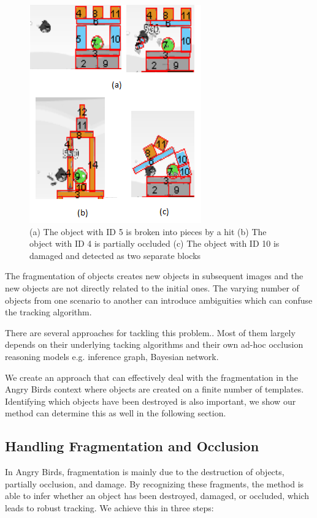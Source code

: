 \documentclass[letterpaper]{article}
\begin{document}
\begin{figure}[t!]
\centering\includegraphics[scale=0.7]{Fragmentation.png}\caption{(a) The object with ID 5 is broken into pieces by a hit (b) The object with ID 4 is partially occluded (c) The object with ID 10 is damaged and detected as two separate blocks}
\label{Fragments}
\end{figure}

The fragmentation of objects creates new objects in subsequent images and the new objects are not directly related to the initial ones. The varying number of objects from one scenario to another can introduce ambiguities which can confuse the tracking algorithm. 

There are several approaches for tackling this problem.\cite{Occlusion1,Occlusion2,Occlusion3}. Most of them largely depends on their underlying tacking algorithms and their own ad-hoc occlusion reasoning models e.g. inference graph, Bayesian network. 

We create an approach that can effectively deal with the fragmentation in the Angry Birds context where objects are created on a finite number of templates. 
Identifying which objects have been destroyed is also important, we show our method can determine this as well in the following section.   

\subsection{Handling Fragmentation and Occlusion}
 
In Angry Birds, fragmentation is mainly due to the destruction of objects, partially occlusion, and damage. By recognizing these fragments, the method is able to infer whether an object has been destroyed, damaged, or occluded, which leads to robust tracking. We achieve this in three steps:
\end{document}
